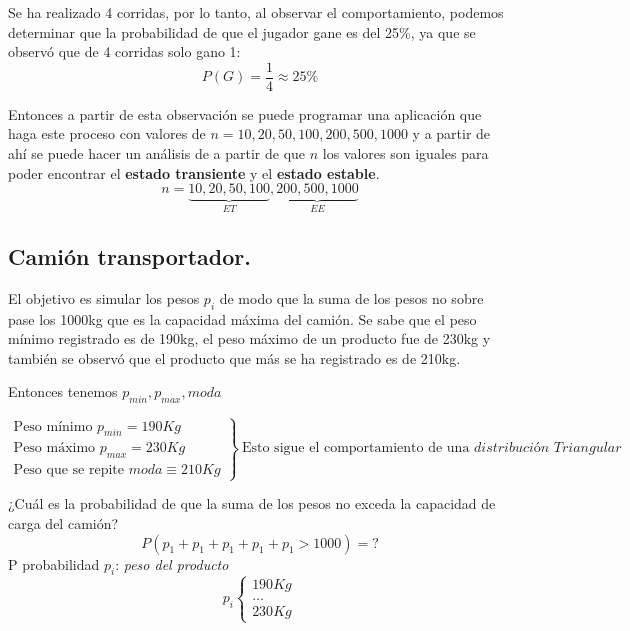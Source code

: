 \documentclass[11pt,letterpaper]{report}
\begin{document}
Se ha realizado 4 corridas, por lo tanto, al observar el comportamiento, podemos determinar que la probabilidad de que el jugador gane es del 25\%, ya que se observó que de 4 corridas solo gano 1:
\[
P(G) = \frac{1}{4} \approx 25\%
\]

Entonces a partir de esta observación se puede programar una aplicación que haga este proceso con valores de $n = 10, 20, 50, 100, 200, 500, 1000$ y a partir de ahí se puede hacer un análisis de a partir de que $n$ los valores son iguales para poder encontrar el \textbf{estado transiente} y el \textbf{estado estable}.
\[
n = \underbrace{10, 20, 50, 100}_{ET},\underbrace{200, 500, 1000}_{EE}
\]

\subsection*{Camión transportador.}

El objetivo es simular los pesos $p_i$ de modo que la suma de los pesos no sobre pase los 1000kg que es la capacidad máxima del camión. Se sabe que el peso mínimo registrado es de 190kg, el peso máximo de un producto fue de 230kg y también se observó que el producto que más se ha registrado es de 210kg.

\begin{center}
\end{center}

Entonces tenemos $p_{min}, p_{max}, moda$

\[
\left.\begin{array}{l}
\text{Peso mínimo } p_{min} = 190Kg\\
\text{Peso máximo } p_{max} = 230Kg\\
\text{Peso que se repite } moda \equiv 210Kg
\end{array}\right\}
\ \text{Esto sigue el comportamiento de una } \textit{distribución Triangular}
\]

¿Cuál es la probabilidad de que la suma de los pesos no exceda la capacidad de carga del camión?
\[
P(p_1 + p_1 + p_1 + p_1 + p_1 > 1000) = ?
\]
P probabilidad \qquad $p_i$: \textit{peso del producto}
\[
p_i
\begin{cases}
190Kg\\
\ldots\\
230Kg
\end{cases}
\]
\end{document}
